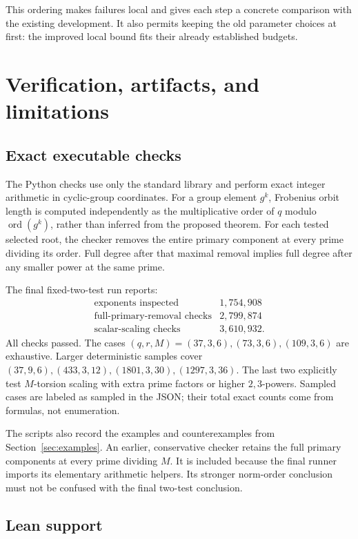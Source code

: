 \documentclass[11pt,a4paper]{article}
\theoremstyle{definition}
\theoremstyle{remark}
\newcommand{\ord}{\operatorname{ord}}
\begin{document}
This ordering makes failures local and gives each step a concrete comparison with
the existing development. It also permits keeping the old parameter choices at
first: the improved local bound fits their already established budgets.

\section{Verification, artifacts, and limitations}
\label{sec:verification}

\subsection{Exact executable checks}

The Python checks use only the standard library and perform exact integer
arithmetic in cyclic-group coordinates. For a group element \(g^k\), Frobenius
orbit length is computed independently as the multiplicative order of \(q\)
modulo \(\ord(g^k)\), rather than inferred from the proposed theorem.
For each tested selected root, the checker removes the entire primary component
at every prime dividing its order. Full degree after that maximal removal implies full
degree after any smaller power at the same prime.

The final fixed-two-test run reports:
\[
\begin{array}{lr}
\text{exponents inspected} & 1{,}754{,}908\\
\text{full-primary-removal checks} & 2{,}799{,}874\\
\text{scalar-scaling checks} & 3{,}610{,}932 .
\end{array}
\]
All checks passed.
The cases \((q,r,M)=(37,3,6),(73,3,6),(109,3,6)\) are exhaustive.
Larger deterministic samples cover
\((37,9,6),(433,3,12),(1801,3,30),(1297,3,36)\).
The last two explicitly test \(M\)-torsion scaling with extra prime factors or
higher \(2,3\)-powers. Sampled cases are labeled as sampled in the JSON;
their total exact counts come from formulas, not enumeration.

The scripts also record the examples and counterexamples from
Section~\ref{sec:examples}. An earlier, conservative checker retains the full
primary components at every prime dividing \(M\). It is included because the
final runner imports its elementary arithmetic helpers. Its stronger norm-order
conclusion must not be confused with the final two-test conclusion.

\subsection{Lean support}
\end{document}
